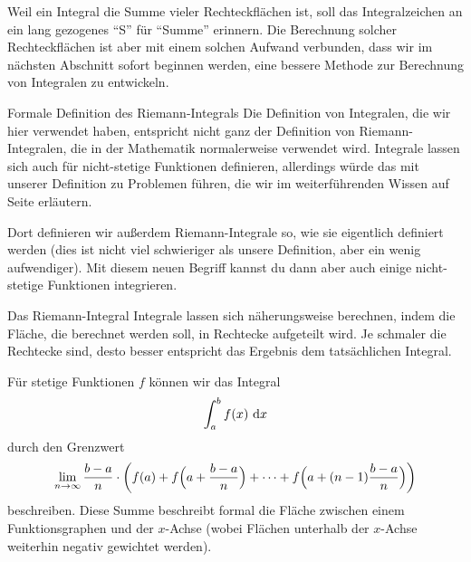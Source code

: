 \documentclass[../../main.tex]{subfiles}
\begin{document}
Weil ein Integral die Summe vieler Rechteckflächen ist, soll das Integralzeichen an ein lang gezogenes \enquote{S} für 
\enquote{Summe} erinnern. Die Berechnung solcher Rechteckflächen ist aber mit einem solchen Aufwand verbunden, dass
wir im nächsten Abschnitt sofort beginnen werden, eine bessere Methode zur Berechnung von Integralen zu entwickeln.

\begin{advanced}{Formale Definition des Riemann-Integrals}
    Die Definition von Integralen, die wir hier verwendet haben, entspricht nicht ganz der Definition von 
    Riemann-Integralen, die in der Mathematik normalerweise verwendet wird. Integrale lassen sich auch für
    nicht-stetige Funktionen definieren, allerdings würde das mit unserer Definition zu Problemen führen, die wir
    im weiterführenden Wissen auf Seite \pageref{riemannintegral-richtig} erläutern. 
    
    Dort definieren wir außerdem Riemann-Integrale so, wie
    sie eigentlich definiert werden (dies ist nicht viel schwieriger als unsere Definition, aber ein wenig aufwendiger). Mit diesem neuen Begriff kannst du dann aber auch einige nicht-stetige Funktionen integrieren.
\end{advanced}
\begin{nutshell}{Das Riemann-Integral}
    Integrale lassen sich näherungsweise berechnen, indem die Fläche, die berechnet werden soll, in Rechtecke aufgeteilt 
    wird. Je schmaler die Rechtecke sind, desto besser entspricht das Ergebnis dem tatsächlichen Integral.

    Für stetige Funktionen $f$ können wir das Integral 
    \[\int_a^bf(x)\mathop{}\mathrm{d} x\] 
    durch den Grenzwert
    \[\lim_{n\rightarrow\infty}\frac{b-a}{n}\cdot \biggl(f(a)+f\Bigl(a+\frac{b-a}{n}\Bigr)+\dots+f\Bigl(a+(n-1)\frac{b-a}{n}\Bigr)\biggr)\]
    beschreiben. Diese Summe beschreibt formal die Fläche zwischen einem Funk\-tions\-graphen und der $x$-Achse (wobei 
    Flächen unterhalb der $x$-Achse weiterhin negativ gewichtet werden).
\end{nutshell}
\end{document}
